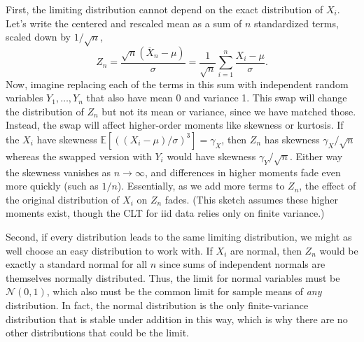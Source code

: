 \documentclass[
  13pt,
  letterpaper,
  DIV=11,
  numbers=noendperiod]{scrreprt}
\newcommand{\E}{\mathbb{E}}
\newcommand{\N}{\mathcal{N}}
\newcommand{\Xbar}{\overline{X}}
\theoremstyle{plain}
\theoremstyle{plain}
\theoremstyle{definition}
\theoremstyle{definition}
\theoremstyle{remark}
\begin{document}
First, the limiting distribution cannot depend on the exact distribution
of \(X_i\). Let's write the centered and rescaled mean as a sum of \(n\)
standardized terms, scaled down by \(1/\sqrt{n}\), \[
Z_n = \frac{\sqrt{n}(\Xbar_n - \mu)}{\sigma} = \frac{1}{\sqrt{n}}\sum_{i=1}^n \frac{X_i - \mu}{\sigma}.
\] Now, imagine replacing each of the terms in this sum with independent
random variables \(Y_1, \ldots, Y_n\) that also have mean 0 and variance
1. This swap will change the distribution of \(Z_n\) but not its mean or
variance, since we have matched those. Instead, the swap will affect
higher-order moments like skewness or kurtosis. If the \(X_i\) have
skewness \(\E[((X_i - \mu)/\sigma)^3] = \gamma_X\), then \(Z_n\) has
skewness \(\gamma_X / \sqrt{n}\) whereas the swapped version with
\(Y_i\) would have skewness \(\gamma_Y / \sqrt{n}\). Either way the
skewness vanishes as \(n\to\infty\), and differences in higher moments
fade even more quickly (such as \(1/n\)). Essentially, as we add more
terms to \(Z_n\), the effect of the original distribution of \(X_i\) on
\(Z_n\) fades. (This sketch assumes these higher moments exist, though
the CLT for iid data relies only on finite variance.)

Second, if every distribution leads to the same limiting distribution,
we might as well choose an easy distribution to work with. If \(X_i\)
are normal, then \(Z_n\) would be exactly a standard normal for all
\(n\) since sums of independent normals are themselves normally
distributed. Thus, the limit for normal variables must be \(\N(0,1)\),
which also must be the common limit for sample means of \emph{any}
distribution. In fact, the normal distribution is the only
finite-variance distribution that is stable under addition in this way,
which is why there are no other distributions that could be the limit.
\end{document}
